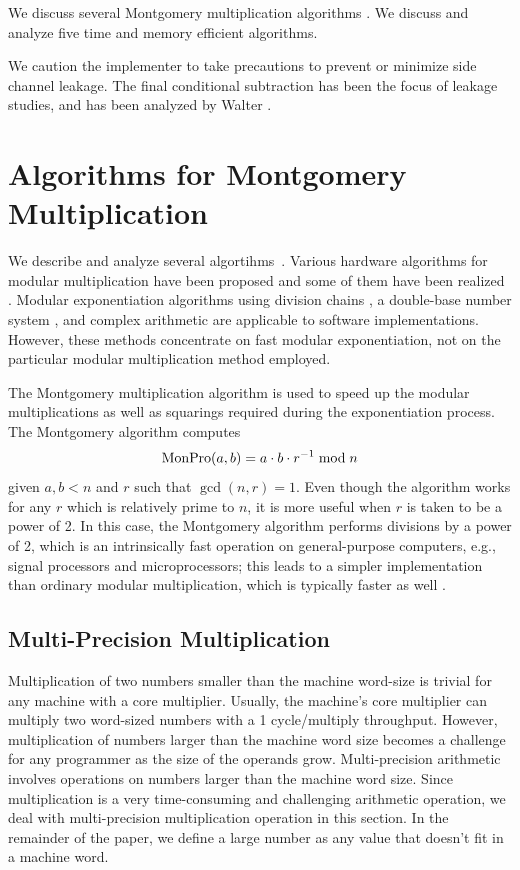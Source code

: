 \documentclass[twocolumn]{svjour3}          %
\begin{document}
We discuss several Montgomery multiplication algorithms
\cite{M85:Modular}.  We discuss and analyze five time and memory
efficient algorithms.

We caution the implementer to take precautions to prevent or minimize
side channel leakage. The final conditional subtraction has been the focus
of leakage studies, and has been analyzed by Walter \cite{W08:Leakage}.

\section{Algorithms for Montgomery Multiplication}

We describe and analyze several algortihms~\cite{KAK96:Analyzing}. 
Various hardware algorithms for modular multiplication have been
proposed and some of them have been realized
\cite{B89:A,T91:A,OK91:A}.  Modular exponentiation algorithms using
division chains \cite{W97:Exponentiation}, a double-base number system
\cite{DJM97:Theory}, and complex arithmetic \cite{DJM97:Algorithms}
are applicable to software implementations. However, these methods
concentrate on fast modular exponentiation, not on the particular
modular multiplication method employed.

The Montgomery multiplication algorithm is used to speed up the
modular multiplications as well as squarings required during the
exponentiation process. The Montgomery algorithm computes
%
\begin{equation}
\mbox{MonPro}(a,b)=a \cdot b \cdot r^{-1} \bmod{n}
\label{monpro1}
\end{equation}
%
given $a,b<n$ and $r$ such that $\gcd(n,r)=1$. Even though the
algorithm works for any $r$ which is relatively prime to $n$, it is
more useful when $r$ is taken to be a power of 2. In this case, the
Montgomery algorithm performs divisions by a power of 2, which is an
intrinsically fast operation on general-purpose computers, e.g.,
signal processors and microprocessors; this leads to a simpler
implementation than ordinary modular multiplication, which is
typically faster as well \cite{NMR95:Can}.

\subsection{Multi-Precision Multiplication}
Multiplication of two numbers smaller than the machine word-size is trivial for any machine with a core multiplier. Usually, the machine's core multiplier can multiply two word-sized numbers with a 1 cycle/multiply throughput. However, multiplication of numbers larger than the machine word size becomes a challenge for any programmer as the size of the operands grow. Multi-precision arithmetic involves operations on numbers larger than the machine word size. Since multiplication is a very time-consuming and challenging arithmetic operation, we deal with multi-precision multiplication operation in this section. In the remainder of the paper, we define a large number as any value that doesn't fit in a machine word.
\end{document}

